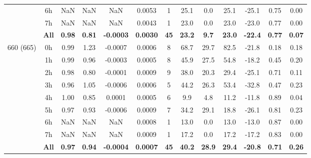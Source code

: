 \documentclass[preview]{standalone}
\begin{document}
\begin{tabular}{ccccccccccccc}
 & 6h & NaN & NaN & NaN & 0.0053 &  1 & 25.1 & 0.0 & 25.1 & -25.1 & 0.75 & 0.00 \\ 
 & 7h & NaN & NaN & NaN & 0.0043 &  1 & 23.0 & 0.0 & 23.0 & -23.0 & 0.77 & 0.00 \\ \cline{2-13}
 & \textbf{All} & \textbf{0.98} & \textbf{0.81} & \textbf{-0.0003} & \textbf{0.0030} & \textbf{45} & \textbf{23.2} & \textbf{9.7} & \textbf{23.0} & \textbf{-22.4} & \textbf{0.77} & \textbf{0.07} \\ \hline
\multirow{9}{*}{660 (665)} & 0h & 0.99 & 1.23 & -0.0007 & 0.0006 &  8 & 68.7 & 29.7 & 82.5 & -21.8 & 0.18 & 0.18 \\ 
 & 1h & 0.99 & 0.96 & -0.0003 & 0.0005 &  8 & 45.9 & 27.5 & 54.8 & -18.2 & 0.45 & 0.20 \\ 
 & 2h & 0.98 & 0.80 & -0.0001 & 0.0009 &  9 & 38.0 & 20.3 & 29.4 & -25.1 & 0.71 & 0.11 \\ 
 & 3h & 0.96 & 1.05 & -0.0006 & 0.0006 &  5 & 44.2 & 26.3 & 53.4 & -32.8 & 0.47 & 0.23 \\ 
 & 4h & 1.00 & 0.85 & 0.0001 & 0.0005 &  6 & 9.9 & 4.8 & 11.2 & -11.8 & 0.89 & 0.04 \\ 
 & 5h & 0.97 & 0.93 & -0.0006 & 0.0009 &  7 & 34.2 & 29.1 & 18.8 & -26.1 & 0.81 & 0.23 \\ 
 & 6h & NaN & NaN & NaN & 0.0008 &  1 & 13.0 & 0.0 & 13.0 & -13.0 & 0.87 & 0.00 \\ 
 & 7h & NaN & NaN & NaN & 0.0009 &  1 & 17.2 & 0.0 & 17.2 & -17.2 & 0.83 & 0.00 \\ \cline{2-13}
 & \textbf{All} & \textbf{0.97} & \textbf{0.94} & \textbf{-0.0004} & \textbf{0.0007} & \textbf{45} & \textbf{40.2} & \textbf{28.9} & \textbf{29.4} & \textbf{-20.8} & \textbf{0.71} & \textbf{0.26} \\ \hline
\hline 
\end{tabular}
\end{document}
